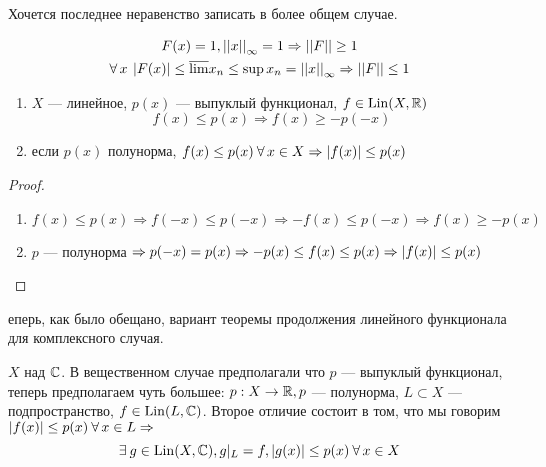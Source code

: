 \documentclass[document]{subfiles}
\begin{document}
Хочется последнее неравенство записать в более общем случае.


\begin{gather*}
    F(x) = 1, \norm{x}_\infty = 1 \Rightarrow \norm{F} \geq 1 \\
    \forall x \: \abs{F(x)} \leq \overline{\liml} x_n \leq \sup x_n = \norm{x}_\infty \Rightarrow \norm{F} \leq 1
    \end{gather*}
\begin{statement}
    \begin{enumerate}       
        \item $X$ --- линейное, $p(x)$ --- выпуклый функционал, $f \in \operatorname{Lin}(X, \mathbb{R})$
        \[ f(x) \leq p(x) \Rightarrow f(x) \geq -p(-x) \] 
        \item если $p(x)$ полунорма, $f(x) \leq p(x) \: \forall x \in X \Rightarrow \abs{f(x)} \leq p(x)$
    \end{enumerate}
\end{statement}

\begin{proof}
    \begin{enumerate}
        \item $f(x) \leq p(x) \Rightarrow f(-x) \leq p(-x) \Rightarrow -f(x) \leq p(-x) \Rightarrow f(x) \geq -p(x) $
        \item $p$ --- полунорма $\Rightarrow p(-x) = p(x) \Rightarrow -p(x) \leq f(x) \leq p(x) \Rightarrow \left| {f(x)} \right| \leq p(x)$
    \end{enumerate}
\end{proof}

еперь, как было обещано, вариант теоремы продолжения линейного функционала для комплексного случая.

\begin{theorem}
    $X$ над $\mathbb{C}$. В вещественном случае предполагали что $p$ --- выпуклый функционал, теперь предполагаем чуть большее: $p: X \rightarrow \mathbb{R}, p$ --- полунорма,
    $L \subset X$ --- подпространство, $f \in \operatorname{Lin}(L, \mathbb{C})$. Второе отличие состоит в том, что мы говорим $\abs{f(x)} \leq p(x) \: \forall x \in L \Rightarrow$ 
    \[ \exists g \in \Lin(X, \bC), g |_L = f, \abs{g(x)} \leq p(x) \: \forall x \in X \]
\end{theorem}
\end{document}
